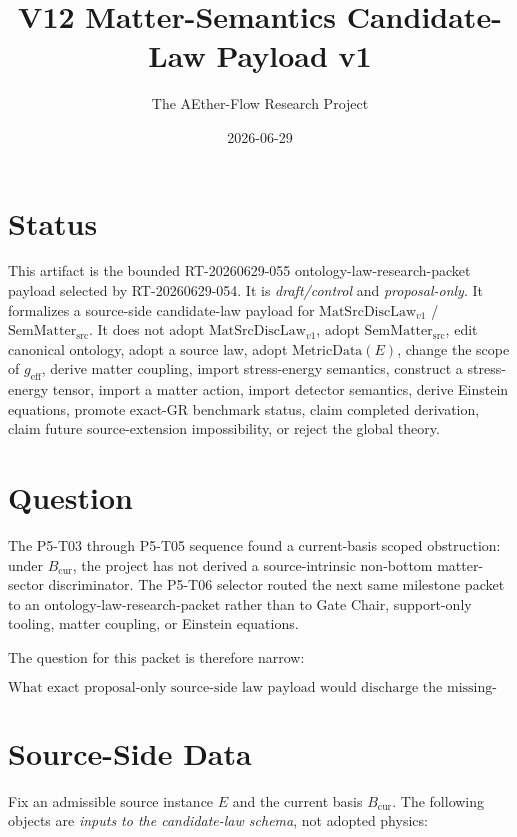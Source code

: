 \documentclass[11pt]{article}
\title{V12 Matter-Semantics Candidate-Law Payload v1}
\author{The AEther-Flow Research Project}
\date{2026-06-29}
\newcommand{\Bcur}{B_{\mathrm{cur}}}
\newcommand{\MatSrcDiscLaw}{\mathrm{MatSrcDiscLaw}_{v1}}
\newcommand{\SemMatterSrc}{\mathrm{SemMatter}_{\mathrm{src}}}
\newcommand{\MetricData}{\mathrm{MetricData}}
\newcommand{\geff}{g_{\mathrm{eff}}}
\begin{document}
\maketitle

\section*{Status}

This artifact is the bounded RT-20260629-055 ontology-law-research-packet
payload selected by RT-20260629-054.  It is \emph{draft/control} and
\emph{proposal-only}.  It formalizes a source-side candidate-law payload for
\(\MatSrcDiscLaw\) / \(\SemMatterSrc\).  It does not adopt
\(\MatSrcDiscLaw\), adopt \(\SemMatterSrc\), edit canonical ontology, adopt a
source law, adopt \(\MetricData(E)\), change the scope of \(\geff\), derive
matter coupling, import stress-energy semantics, construct a stress-energy
tensor, import a matter action, import detector semantics, derive Einstein
equations, promote exact-GR benchmark status, claim completed derivation,
claim future source-extension impossibility, or reject the global theory.

\section{Question}

The P5-T03 through P5-T05 sequence found a current-basis scoped obstruction:
under \(\Bcur\), the project has not derived a source-intrinsic non-bottom
matter-sector discriminator.  The P5-T06 selector routed the next same
milestone packet to an ontology-law-research-packet rather than to Gate Chair,
support-only tooling, matter coupling, or Einstein equations.

The question for this packet is therefore narrow:

\[
  \text{What exact proposal-only source-side law payload would discharge the
  missing-law slot, if later audit, stress, selector, and human gate accepted it?}
\]

\section{Source-Side Data}

Fix an admissible source instance \(E\) and the current basis \(\Bcur\).  The
following objects are \emph{inputs to the candidate-law schema}, not adopted
physics:
\end{document}
